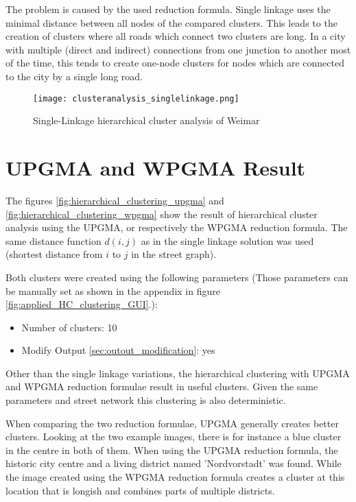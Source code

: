 The problem is caused by the used reduction formula. Single linkage uses the minimal distance between all nodes of the compared clusters. This leads to the creation of clusters where all roads which connect two clusters are long. In a city with multiple (direct and indirect) connections from one junction to another most of the time, this tends to create one-node clusters for nodes which are connected to the city by a single long road.

\begin{figure}
    \centering
    \begin{mdframed}[style=mdthight, userdefinedwidth=0.7\textwidth, align=center]
        \texttt{[image: clusteranalysis\_singlelinkage.png]}
    \end{mdframed}
    \caption{Single-Linkage hierarchical cluster analysis of Weimar\label{fig:SingleLinkage}}
\end{figure}

\pagebreak
\section{UPGMA and WPGMA Result}
\label{sec:UPGMAandWPGMA}
The figures \ref{fig:hierarchical_clustering_upgma} and \ref{fig:hierarchical_clustering_wpgma} show the result of hierarchical cluster analysis using the \acrshort{UPGMA}, or respectively the \acrshort{WPGMA} reduction formula. The same distance function $d(i, j)$ as in the single linkage solution was used (shortest distance from $i$ to $j$ in the street graph).

Both clusters were created using the following parameters (Those parameters can be manually set as shown in the appendix in figure \ref{fig:applied_HC_clustering_GUI}.):

\begin{itemize}
    \item Number of clusters: 10
    \item Modify Output \ref{sec:outout_modification}: yes
\end{itemize}

Other than the single linkage variations, the hierarchical clustering with \acrshort{UPGMA} and \acrshort{WPGMA} reduction formulae result in useful clusters. Given the same parameters and street network this clustering is also deterministic.

When comparing the two reduction formulae, \acrshort{UPGMA} generally creates better clusters. Looking at the two example images, there is for instance a blue cluster in the centre in both of them. When using the \acrshort{UPGMA} reduction formula, the historic city centre and a living district named 'Nordvorstadt' was found. While the image created using the \acrshort{WPGMA} reduction formula creates a cluster at this location that is longish and combines parts of multiple districts.

